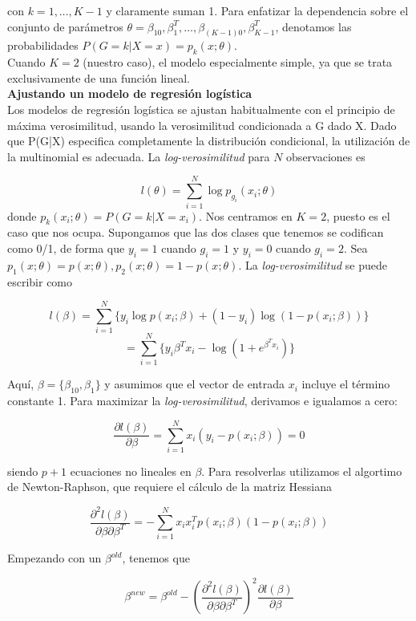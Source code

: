   con $k=1,\dots,K-1$ y claramente suman 1. Para enfatizar la dependencia sobre el conjunto de parámetros $\theta = {\beta_{10},\beta_1^T,\dots,\beta_{(K-1)0},\beta_{K-1}^T}$, denotamos las probabilidades $P(G=k|X=x) = p_k(x;\theta)$. \\
  
  Cuando $K=2$ (nuestro caso), el modelo especialmente simple, ya que se trata exclusivamente de una función lineal. \\
  
  \textbf{Ajustando un modelo de regresión logística} \\
  
  Los modelos de regresión logística se ajustan habitualmente con el principio de máxima verosimilitud, usando la verosimilitud condicionada a G dado X. Dado que P(G|X) especifica completamente la distribución condicional, la utilización de la multinomial es adecuada. La \textit{log-verosimilitud} para $N$ observaciones es
  
  $$l(\theta) = \sum_{i=1}^{N} \log p_{g_i}(x_i;\theta)$$
  donde $p_k(x_i;\theta) = P(G=k|X=x_i)$. Nos centramos en $K=2$, puesto es el caso que nos ocupa. Supongamos que las dos clases que tenemos se codifican como 0/1, de forma que $y_i=1$ cuando $g_i=1$ y $y_i=0$ cuando $g_i=2$. Sea $p_1(x;\theta) = p(x;\theta), p_2(x;\theta) = 1 -p(x;\theta)$. La \textit{log-verosimilitud} se puede escribir como
  
  $$l(\beta) = \sum_{i=1}^{N} \{ y_i \log p(x_i;\beta)+(1-y_i) \log(1-p(x_i;\beta)) \}$$
  $$ = \sum_{i=1}^{N} \{y_i \beta^T x_i - \log(1+e^{\beta^T x_i}) \}$$
  
  Aquí, $\beta = \{\beta_{10},\beta_1 \}$ y asumimos que el vector de entrada $x_i$ incluye el término constante 1. Para maximizar la \textit{log-verosimilitud}, derivamos e igualamos a cero:
  
  $$\frac{\partial l(\beta)}{\partial \beta} = \sum_{i=1}^{N} x_i (y_i -p(x_i;\beta))=0$$
  
  siendo $p+1$ ecuaciones no lineales en $\beta$.  Para resolverlas utilizamos el algortimo de Newton-Raphson, que requiere el cálculo de la matriz Hessiana
  
  $$\frac{\partial^2 l(\beta)}{\partial \beta \partial \beta^T} = - \sum_{i=1}^{N} x_i x_i^T p(x_i;\beta)(1-p(x_i;\beta))$$
  
  Empezando con un $\beta^{old}$, tenemos que
  
  $$\beta^{new} = \beta^{old} - \left(\frac{\partial^2 l(\beta)}{\partial \beta \partial \beta^T}\right)^2 \frac{\partial l(\beta)}{\partial \beta}$$
  
